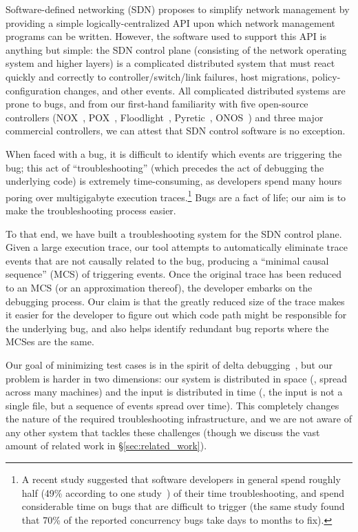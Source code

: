 Software-defined networking (SDN) proposes to simplify network management by
providing a simple logically-centralized API upon which network management
programs can be written. However, the software used to support this API is
anything but simple: the SDN control plane (consisting of the network
operating system and higher layers) is a complicated distributed system that
must react quickly and correctly to controller/switch/link failures, host migrations,
policy-configuration changes, and other events.
All complicated distributed systems are prone to bugs, and from our first-hand
familiarity with five open-source controllers (NOX~\cite{nox},
POX~\cite{pox}, Floodlight~\cite{floodlight},
Pyretic~\cite{frenetic}, ONOS~\cite{ONOS}) and three major commercial controllers, we can
attest that SDN control software is no exception.

When faced with a bug, it is difficult to identify which events are triggering the
bug; this act of ``troubleshooting'' (which precedes the act of debugging the
underlying code) is extremely time-consuming, as developers spend many hours poring
over multigigabyte execution traces.\footnote{A recent study suggested that software developers in general spend roughly half (49\% according to one
study~\cite{msoft_concurrency}) of their time troubleshooting, and spend
considerable time on bugs that are difficult to trigger (the same study found
that 70\% of the reported concurrency bugs take days to months to fix).} Bugs
are a fact of life; our aim is to make the troubleshooting process easier.

To that end, we have built a troubleshooting system for the SDN control plane.
Given a large execution trace, our tool attempts to automatically eliminate
trace events that are not causally related to the bug, producing a ``minimal
causal sequence'' (MCS) of triggering events. Once the original trace has
been reduced to an MCS (or an approximation thereof), the developer embarks
on the debugging process. Our claim is that the greatly reduced size of the
trace makes it easier for the developer to figure out which code path might be
responsible for the underlying bug, and also helps identify redundant bug
reports where the MCSes are the same.

Our goal of minimizing test cases is in the spirit of delta debugging~\cite{Zeller:1999:YMP:318773.318946}, but our
problem is harder in two dimensions: our system is distributed in space (\ie,
spread across many machines) and the input is distributed in time (\ie, the
input is not a single file, but a sequence of events spread over time). This
completely changes the nature of the required troubleshooting infrastructure,
and we are not aware of any other system that tackles these challenges (though
we discuss the vast amount of related work in \S\ref{sec:related_work}).

